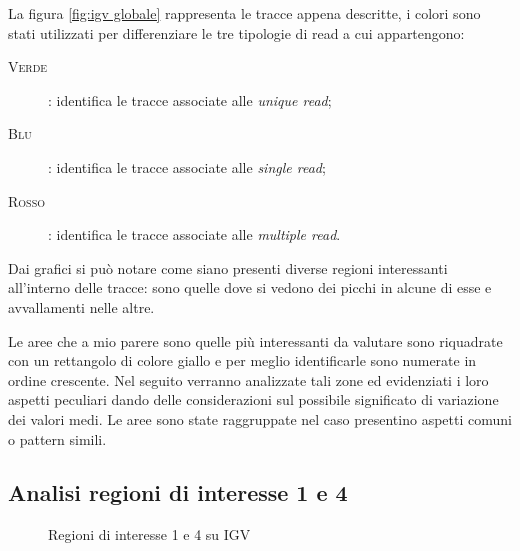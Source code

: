 La figura \ref{fig:igv globale} rappresenta le tracce appena descritte, i colori sono stati utilizzati per differenziare le tre tipologie di read a cui appartengono:
\begin{description}
\item[\textsc{Verde}]: identifica le tracce associate alle \emph{unique read};
\item[\textsc{Blu}]: identifica le tracce associate alle \emph{single read};
\item[\textsc{Rosso}]: identifica le tracce associate alle \emph{multiple read}.
\end{description}

Dai grafici si può notare come siano presenti diverse regioni interessanti all'interno delle tracce: sono quelle dove si vedono dei picchi in alcune di esse e avvallamenti nelle altre.

Le aree che a mio parere sono quelle più interessanti da valutare sono riquadrate con un rettangolo di colore giallo e per meglio identificarle sono numerate in ordine crescente.
Nel seguito verranno analizzate tali zone ed evidenziati i loro aspetti peculiari dando delle considerazioni sul possibile significato di variazione dei valori medi.
Le aree sono state raggruppate nel caso presentino aspetti comuni o pattern simili.

\subsection{Analisi regioni di interesse 1 e 4}
\begin{figure}[htbp]
\centering
{} \quad
{}
\caption{Regioni di interesse 1 e 4 su IGV}
\label{fig:regioni 1 e 4}
\end{figure}


